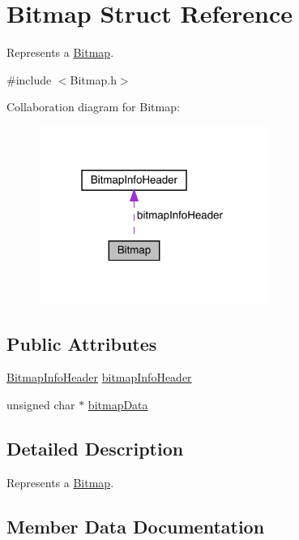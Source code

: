 \hypertarget{struct_bitmap}{}\section{Bitmap Struct Reference}
\label{struct_bitmap}


Represents a \hyperlink{struct_bitmap}{Bitmap}.  




{\ttfamily \#include $<$Bitmap.\+h$>$}



Collaboration diagram for Bitmap\+:\nopagebreak
\begin{figure}[H]
\begin{center}
\leavevmode
\includegraphics[width=211pt]{struct_bitmap__coll__graph}
\end{center}
\end{figure}
\subsection*{Public Attributes}
\begin{DoxyCompactItemize}
\item 
\hyperlink{struct_bitmap_info_header}{Bitmap\+Info\+Header} \hyperlink{struct_bitmap_a95c481a5ce1ff4af08cd135ca4af120b}{bitmap\+Info\+Header}
\item 
unsigned char $\ast$ \hyperlink{struct_bitmap_a581eac36ec50d730299b6df60e644750}{bitmap\+Data}
\end{DoxyCompactItemize}


\subsection{Detailed Description}
Represents a \hyperlink{struct_bitmap}{Bitmap}. 

\subsection{Member Data Documentation}
\hypertarget{struct_bitmap_a581eac36ec50d730299b6df60e644750}{}\label{struct_bitmap_a581eac36ec50d730299b6df60e644750} 
